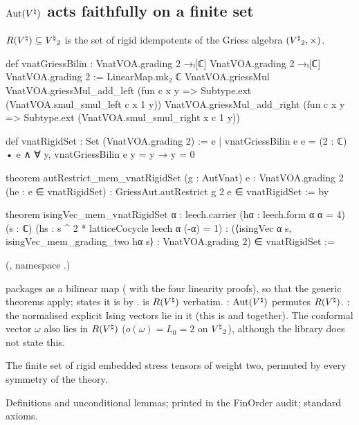 \subsection{\texorpdfstring{$\operatorname{Aut}({V^{\natural}})$}{Aut(V)} acts faithfully on a finite set}

\begin{definition}\label{ch20:def:rigidset}
$R({V^{\natural}})\subseteq{V^{\natural}}_2$ is the set of rigid idempotents of the Griess algebra $({V^{\natural}}_2,\times)$.
\end{definition}
\begin{leancode}
def vnatGriessBilin :
    VnatVOA.grading 2 →ₗ[ℂ] VnatVOA.grading 2 →ₗ[ℂ] VnatVOA.grading 2 :=
  LinearMap.mk₂ ℂ VnatVOA.griessMul VnatVOA.griessMul_add_left
    (fun c x y => Subtype.ext (VnatVOA.smul_smul_left c x 1 y))
    VnatVOA.griessMul_add_right
    (fun c x y => Subtype.ext (VnatVOA.smul_smul_right x c 1 y))

def vnatRigidSet : Set (VnatVOA.grading 2) :=
  {e | vnatGriessBilin e e = (2 : ℂ) • e ∧ ∀ y, vnatGriessBilin e y = y → y = 0}

theorem autRestrict_mem_vnatRigidSet (g : AutVnat) {e : VnatVOA.grading 2}
    (he : e ∈ vnatRigidSet) : GriessAut.autRestrict g 2 e ∈ vnatRigidSet := by

theorem isingVec_mem_vnatRigidSet {α : leech.carrier} (hα : leech.form α α = 4) (s : ℂ)
    (hs : s ^ 2 * latticeCocycle leech α (-α) = 1) :
    (⟨isingVec α s, isingVec_mem_grading_two hα s⟩ : VnatVOA.grading 2) ∈ vnatRigidSet :=
\end{leancode}
(, namespace .)
\begin{dictionary}
 packages  as a bilinear map ( with the four linearity proofs),
so that the generic theorems apply;  states it is  by .
 is $R({V^{\natural}})$ verbatim.  : $\operatorname{Aut}({V^{\natural}})$ permutes $R({V^{\natural}})$.
: the normalised explicit Ising vectors lie in it (this is
 and  together).  The conformal vector $\omega$ also lies in $R({V^{\natural}})$
($o(\omega)=L_0=2$ on ${V^{\natural}}_2$), although the library does not state this.
\end{dictionary}
\begin{physics}
The finite set of rigid embedded stress tensors of weight two, permuted by every symmetry of the theory.
\end{physics}
\begin{status}
Definitions and unconditional lemmas; printed in the FinOrder audit; standard axioms.
\end{status}

